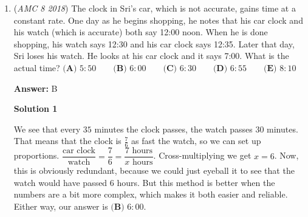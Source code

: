 \begin{enumerate}
 
We sum the 2 possibilities up to get $\frac{(3\cdot2)\cdot4!+(4\cdot2)\cdot4!}{6!} = \frac{14\cdot4!}{6!}=\boxed{\frac{7}{15}}$ or $\textbf{(C)}$.

 If you got stuck on this problem, refer to AOPS Probability and Combinations.

 



\textbf{Solution 2}

We can ignore other students, and treat Abby and Bridget as indistinguishable (since we only care about adjacency, not their order). Thus, the total number of ways is $n(S) = _{6}C_{2} = 15$ .In one row, they can be adjacent 2 ways:  $2 \cdot 2 rows = 4$. In one column, they can only be adjacent 1 way: $1 \cdot 3 cols = 3$. Add these cases $4+3=7$, and therefore, P(Abby and Bridget sitting adjacent) is $\boxed{\textbf{(C) }\frac{7}{15}}$.

 



\textbf{Solution 3}

We can split the seating into two separate cases: if Abby is sitting on the corners, and if Abby isn't. If Abby is sitting in the corners, there is a $\frac{2}{5}$ chance Bridget is sitting next to Abby, so there is a $\frac{2}{5} \cdot \frac{4}{6} = \frac{4}{15}$ chance for the first case. Meanwhile, if Abby is sitting in the middle row, there is a $\frac{3}{5}$ chance Bridget is sitting next to Abby, so there is a $\frac{3}{5} \cdot \frac{2}{6} = \frac{1}{5}$ chance for the second case. Therefore, P(Abby and Bridget are sitting adjacent to each other) is $\frac{4}{15} + \frac{1}{5} = \boxed{\frac{7}{15}}$ , or $\boxed{\textbf{C}}$.

 


	\item (\textit{AMC 8 2018}) The clock in Sri's car, which is not accurate, gains time at a constant rate. One day as he begins shopping, he notes that his car clock and his watch (which is accurate) both say 12:00 noon. When he is done shopping, his watch says 12:30 and his car clock says 12:35. Later that day, Sri loses his watch. He looks at his car clock and it says 7:00. What is the actual time?
$\textbf{(A) }5:50\qquad\textbf{(B) }6:00\qquad\textbf{(C) }6:30\qquad\textbf{(D) }6:55\qquad \textbf{(E) }8:10$

 \textbf{Answer: }B



\textbf{Solution 1}

We see that every $35$ minutes the clock passes, the watch passes $30$ minutes. That means that the clock is $\frac{7}{6}$ as fast the watch, so we can set up proportions. $\dfrac{\text{car clock}}{\text{watch}}=\dfrac{7}{6}=\dfrac{7 \text{ hours}}{x \text{ hours}}$. Cross-multiplying we get $x=6$. Now, this is obviously redundant, because we could just eyeball it to see that the watch would have passed $6$ hours. But this method is better when the numbers are a bit more complex, which makes it both easier and reliable. Either way, our answer is $\boxed{\textbf{(B) }6:00}$.


\end{enumerate}
